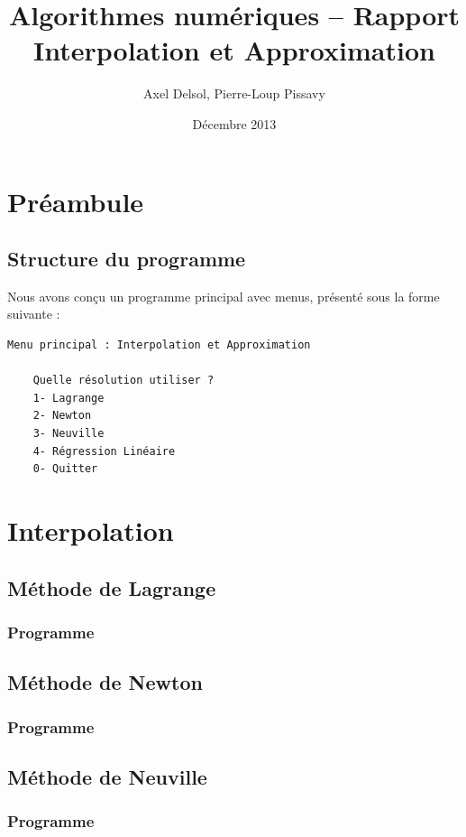 \documentclass{report}
\title{Algorithmes numériques -- Rapport \\ \vspace{0.5cm}Interpolation et Approximation}
\author{Axel Delsol, Pierre-Loup Pissavy}
\date{Décembre 2013}
\begin{document}
  \maketitle
  \tableofcontents

  \chapter{Préambule}
    \section{Structure du programme}
    Nous avons conçu un programme principal avec menus, présenté sous la forme suivante :
    \begin{lstlisting}[style=apercu, name=Menu Principal]
    Menu principal : Interpolation et Approximation

    Quelle résolution utiliser ?
    1- Lagrange
    2- Newton
    3- Neuville
    4- Régression Linéaire
    0- Quitter
    \end{lstlisting}
  \chapter{Interpolation}
    \section{Méthode de Lagrange}
      \subsection{Programme}
	
	\renewcommand{\arraystretch}{2}
	\renewcommand{\arraystretch}{1}
    \section{Méthode de Newton}
      \subsection{Programme}
	
	\renewcommand{\arraystretch}{2}
	\renewcommand{\arraystretch}{1}
    \section{Méthode de Neuville}
      \subsection{Programme}
	
\end{document}

